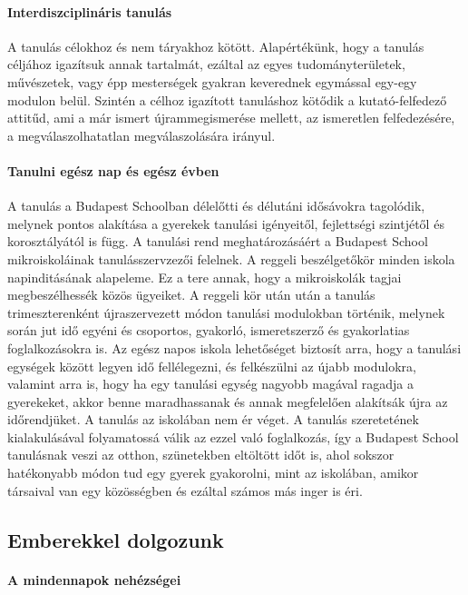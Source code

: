 \paragraph{Interdiszciplináris tanulás}

A tanulás célokhoz és nem táryakhoz kötött. Alapértékünk, hogy a tanulás
céljához igazítsuk annak tartalmát, ezáltal az egyes tudományterületek,
művészetek, vagy épp mesterségek gyakran keverednek egymással egy-egy modulon
belül. Szintén a célhoz igazított tanuláshoz kötődik a kutató-felfedező
attitűd, ami a már ismert újrammegismerése mellett, az ismeretlen
felfedezésére,
a megválaszolhatatlan megválaszolására irányul.


\paragraph{Tanulni egész nap és egész évben}

A tanulás a Budapest Schoolban délelőtti és délutáni idősávokra tagolódik,
melynek pontos
alakítása a gyerekek tanulási igényeitől, fejlettségi szintjétől és
korosztályától is függ. A tanulási rend meghatározásáért a Budapest
School mikroiskoláinak tanulásszervzezői felelnek. A reggeli
beszélgetőkör minden iskola napinditásának alapeleme. Ez a tere annak,
hogy a mikroiskolák tagjai megbeszélhessék közös ügyeiket. A reggeli kör
után után a tanulás trimeszterenként újraszervezett módon tanulási
modulokban történik, melynek során jut idő egyéni és csoportos,
gyakorló, ismeretszerző és gyakorlatias foglalkozásokra is. Az egész
napos iskola lehetőséget biztosít arra, hogy a tanulási egységek között
legyen idő fellélegezni, és felkészülni az újabb modulokra, valamint
arra is, hogy ha egy tanulási egység nagyobb magával ragadja a
gyerekeket, akkor benne maradhassanak és annak megfelelően alakítsák
újra az időrendjüket. A tanulás az iskolában nem ér véget. A tanulás
szeretetének kialakulásával folyamatossá válik az ezzel való foglalkozás, így a
Budapest School tanulásnak veszi az otthon, szünetekben eltöltött időt is, ahol
sokszor hatékonyabb módon tud egy gyerek gyakorolni, mint az iskolában, amikor
társaival van egy közösségben és ezáltal számos más inger is éri.


\subsection{Emberekkel dolgozunk}
\paragraph{A mindennapok
      nehézségei}

